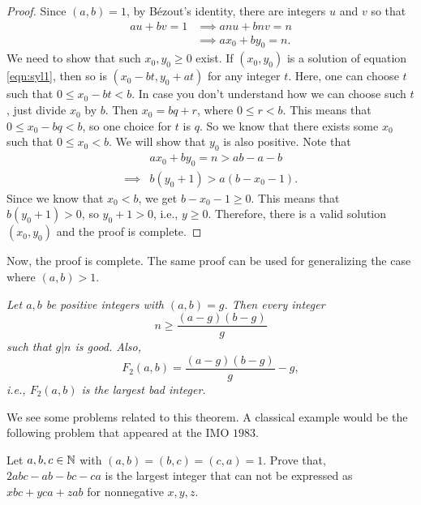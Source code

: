 \documentclass{subfile}
\begin{document}
	\begin{proof}
		Since $(a,b)=1$, by B\'{e}zout's identity, there are integers $u$ and $v$ so that
			\begin{align}
				au+bv = 1 & \implies anu+bnv = n\nonumber\\
				& \implies ax_0+by_0  = n.\label{eqn:syl1}
			\end{align} 
		We need to show that such $x_0,y_0 \geq 0$ exist. If $(x_0,y_0)$ is a solution of equation \eqref{eqn:syl1}, then so is $(x_0-bt,y_0+at)$ for any integer $t$. Here, one can choose $t$ such that $0 \leq x_0-bt<b$. In case you don't understand how we can choose such $t$, just divide $x_0$ by $b$. Then $x_0=bq+r$, where $0\leq r <b$. This means that $0 \leq x_0 -bq <b$, so one choice for $t$ is $q$. So we know that there exists some $x_0$ such that $0 \leq x_0<b$. We will show that $y_0$ is also positive. Note that
			\begin{align*}
				& ax_0+by_0 = n > ab-a-b\\
				\implies & b(y_0+1)  > a(b-x_0-1).
			\end{align*}
		Since we know that $x_0<b$, we get $b-x_0-1\geq 0$. This means that $b(y_0+1) >0$, so $y_0+1>0$, i.e., $y\geq0$. Therefore, there is a valid solution $(x_0,y_0)$ and the proof is complete.
	\end{proof}
Now, the proof is complete. The same proof can be used for generalizing the case where $(a,b)>1$.
	\begin{theorem}\slshape
		Let $a,b$ be positive integers with $(a,b)=g$. Then every integer \[n\geq\dfrac{(a-g)(b-g)}{g}\] such that $g|n$ is good. Also, \[F_2(a,b)=\dfrac{(a-g)(b-g)}{g}-g,\] i.e., $F_2(a,b)$ is the largest bad integer.
	\end{theorem}
We see some problems related to this theorem. A classical example would be the following problem that appeared at the IMO $1983$.
	\begin{problem}[IMO 1983]
		Let $a,b,c\in\mathbb{N}$ with $(a,b)=(b,c)=(c,a)=1$. Prove that, $2abc-ab-bc-ca$ is the largest integer that can not be expressed as $xbc+yca+zab$ for nonnegative $x,y,z$.
	\end{problem}
	
\end{document}
